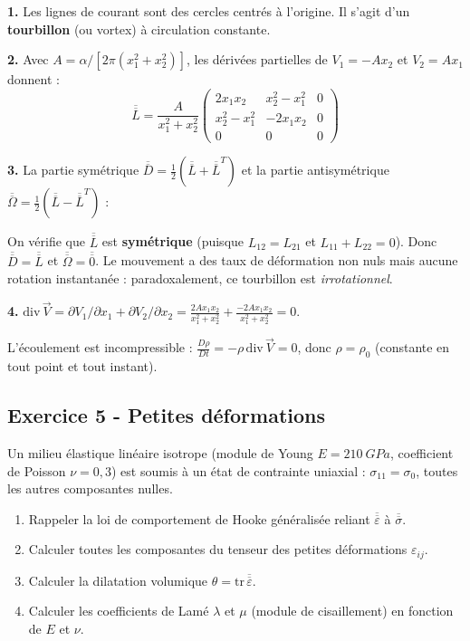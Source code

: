 \documentclass[12pt,a4paper]{article}
\begin{document}
\begin{boitecorrige}
\textbf{1.} Les lignes de courant sont des cercles centrés à l'origine. Il s'agit d'un \textbf{tourbillon} (ou vortex) à circulation constante.

\textbf{2.} Avec $A = \alpha/[2\pi(x_1^2+x_2^2)]$, les dérivées partielles de $V_1 = -Ax_2$ et $V_2 = Ax_1$ donnent :
\[
\overline{\overline{L}} = \frac{A}{x_1^2+x_2^2}\begin{pmatrix}2x_1x_2 & x_2^2-x_1^2 & 0\\ x_2^2-x_1^2 & -2x_1x_2 & 0\\ 0 & 0 & 0\end{pmatrix}
\]

\textbf{3.} La partie symétrique $\overline{\overline{D}} = \frac{1}{2}(\overline{\overline{L}}+\overline{\overline{L}}^T)$ et la partie antisymétrique $\overline{\overline{\Omega}} = \frac{1}{2}(\overline{\overline{L}}-\overline{\overline{L}}^T)$ :

On vérifie que $\overline{\overline{L}}$ est \textbf{symétrique} (puisque $L_{12}=L_{21}$ et $L_{11}+L_{22}=0$). Donc $\overline{\overline{D}} = \overline{\overline{L}}$ et $\overline{\overline{\Omega}} = \overline{\overline{0}}$. Le mouvement a des taux de déformation non nuls mais aucune rotation instantanée : paradoxalement, ce tourbillon est \textit{irrotationnel}.

\textbf{4.} $\mathrm{div}\,\vec{V} = \partial V_1/\partial x_1 + \partial V_2/\partial x_2 = \frac{2Ax_1x_2}{x_1^2+x_2^2} + \frac{-2Ax_1x_2}{x_1^2+x_2^2} = 0$.

L'écoulement est incompressible : $\frac{D\rho}{Dt} = -\rho\,\mathrm{div}\,\vec{V} = 0$, donc $\rho = \rho_0$ (constante en tout point et tout instant).
\end{boitecorrige}

\subsection*{Exercice 5 - Petites déformations \niveau{\difficile}}

\begin{boiteexercice}
Un milieu élastique linéaire isotrope (module de Young $E=\qty{210}{GPa}$, coefficient de Poisson $\nu=0{,}3$) est soumis à un état de contrainte uniaxial : $\sigma_{11} = \sigma_0$, toutes les autres composantes nulles.
\begin{enumerate}
  \item Rappeler la loi de comportement de Hooke généralisée reliant $\overline{\overline{\varepsilon}}$ à $\overline{\overline{\sigma}}$.
  \item Calculer toutes les composantes du tenseur des petites déformations $\varepsilon_{ij}$.
  \item Calculer la dilatation volumique $\theta = \mathrm{tr}\,\overline{\overline{\varepsilon}}$.
  \item Calculer les coefficients de Lamé $\lambda$ et $\mu$ (module de cisaillement) en fonction de $E$ et $\nu$.
\end{enumerate}
\end{boiteexercice}
\end{document}
